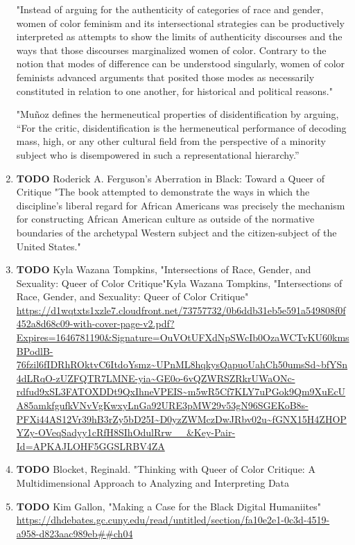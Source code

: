 \documentclass[11pt]{article}
\begin{document}
\begin{enumerate}
"Instead of arguing for the authenticity of categories of race and
gender, women of color feminism and its intersectional strategies can
be productively interpreted as attempts to show the limits of
authenticity discourses and the ways that those discourses
marginalized women of color. Contrary to the notion that modes of
difference can be understood singularly, women of color feminists
advanced arguments that posited those modes as necessarily constituted
in relation to one another, for historical and political reasons."

"Muñoz defines the hermeneutical properties of disidentification by
arguing, “For the critic, disidentification is the hermeneutical
performance of decoding mass, high, or any other cultural field from
the perspective of a minority subject who is disempowered in such a
representational hierarchy.”

\item {\bfseries\sffamily TODO} Roderick A. Ferguson’s Aberration in Black: Toward a Queer of Critique
\label{sec:org0bff1e6}
"The book attempted to demonstrate the ways in which the discipline’s
liberal regard for African Americans was precisely the mechanism for
constructing African American culture as outside of the normative
boundaries of the archetypal Western subject and the citizen-subject
of the United States."

\item {\bfseries\sffamily TODO} Kyla Wazana Tompkins, "Intersections of Race, Gender, and Sexuality: Queer of Color Critique"Kyla Wazana Tompkins, "Intersections of Race, Gender, and Sexuality: Queer of Color Critique"
\label{sec:org98d5ca8}
\url{https://d1wqtxts1xzle7.cloudfront.net/73757732/0b6ddb31eb5e591a549808f0f452a8d68c09-with-cover-page-v2.pdf?Expires=1646781190\&Signature=OuVOtUFXdNpSWcIb0OzaWCTvKU60kmsBPodlB-76fzil6fIDRhROktvC6ItdoYsmz\~UPnML8hqkysQapuoUahCh50umsSd\~bfYSn4dLRqO-zUZFQTR7LMNE-yia\~GE0o-6vQZWRSZRkrUWaONc-rdfud9xSL3FATOXDDt9QxIhneVPEIS\~m5wR5Cf7KLY7uPGok9Qm9XuEcUA85amkfgufkVNvVgKwxyLnGa92URE3pMW29v53gN96SGEKoB8s-PFXi44AS12Vr39hB3rZy5bD25I\~D0yzZWMczDwJRbv02u\~fGNX15H4ZHOPYZy-OVeqSadyy1cRfH8SIhOdulRrw\_\_\&Key-Pair-Id=APKAJLOHF5GGSLRBV4ZA}

\item {\bfseries\sffamily TODO} Blocket, Reginald. "Thinking with Queer of Color Critique: A
\label{sec:org9879d7b}
Multidimensional Approach to Analyzing and Interpreting Data

\item {\bfseries\sffamily TODO} Kim Gallon, "Making a Case for the Black Digital Humaniites"
\label{sec:org0272606}
\url{https://dhdebates.gc.cuny.edu/read/untitled/section/fa10e2e1-0c3d-4519-a958-d823aac989eb\#\#ch04}
\end{enumerate}
\end{document}
